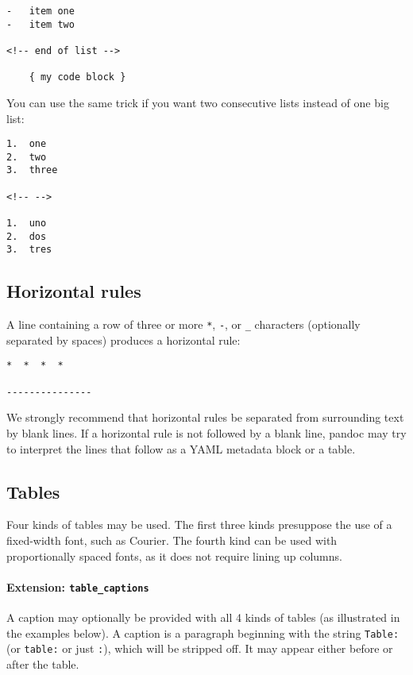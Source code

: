 \begin{verbatim}
-   item one
-   item two

<!-- end of list -->

    { my code block }
\end{verbatim}

You can use the same trick if you want two consecutive lists instead of
one big list:

\begin{verbatim}
1.  one
2.  two
3.  three

<!-- -->

1.  uno
2.  dos
3.  tres
\end{verbatim}

\hypertarget{horizontal-rules}{%
\subsection{Horizontal rules}\label{horizontal-rules}}

A line containing a row of three or more \texttt{*}, \texttt{-}, or
\texttt{\_} characters (optionally separated by spaces) produces a
horizontal rule:

\begin{verbatim}
*  *  *  *

---------------
\end{verbatim}

We strongly recommend that horizontal rules be separated from
surrounding text by blank lines. If a horizontal rule is not followed by
a blank line, pandoc may try to interpret the lines that follow as a
YAML metadata block or a table.

\hypertarget{tables}{%
\subsection{Tables}\label{tables}}

Four kinds of tables may be used. The first three kinds presuppose the
use of a fixed-width font, such as Courier. The fourth kind can be used
with proportionally spaced fonts, as it does not require lining up
columns.

\hypertarget{extension-table_captions}{%
\paragraph{\texorpdfstring{Extension:
\texttt{table\_captions}}{Extension: table\_captions}}\label{extension-table_captions}}

A caption may optionally be provided with all 4 kinds of tables (as
illustrated in the examples below). A caption is a paragraph beginning
with the string \texttt{Table:} (or \texttt{table:} or just \texttt{:}),
which will be stripped off. It may appear either before or after the
table.


